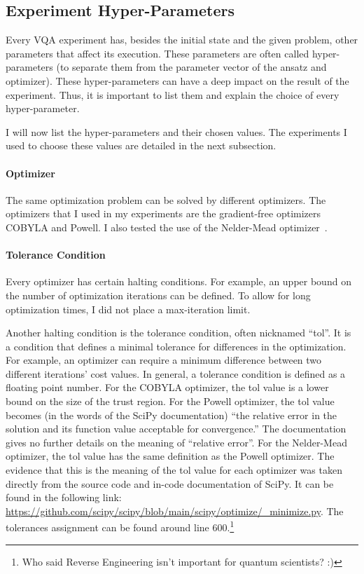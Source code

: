 \documentclass[a4paper,12pt]{article}
\begin{document}
\subsection{Experiment Hyper-Parameters} \label{subsec:hyperparams}
Every VQA experiment has, besides the initial state and the given problem, other parameters that affect its execution.
These parameters are often called hyper-parameters (to separate them from the parameter vector of the ansatz and optimizer).
These hyper-parameters can have a deep impact on the result of the experiment.
Thus, it is important to list them and explain the choice of every hyper-parameter.

I will now list the hyper-parameters and their chosen values.
The experiments I used to choose these values are detailed in the next subsection.

\paragraph*{Optimizer}
The same optimization problem can be solved by different optimizers.
The optimizers that I used in my experiments are the gradient-free optimizers COBYLA and Powell. I also tested the use of the Nelder-Mead optimizer~\cite{Nelder-Mead}.

\paragraph*{Tolerance Condition}
Every optimizer has certain halting conditions.
For example, an upper bound on the number of optimization iterations can be defined.
To allow for long optimization times, I did not place a max-iteration limit.

Another halting condition is the tolerance condition, often nicknamed ``tol''.
It is a condition that defines a minimal tolerance for differences in the optimization.
For example, an optimizer can require a minimum difference between two different iterations' cost values.
In general, a tolerance condition is defined as a floating point number.
For the COBYLA optimizer, the tol value is a lower bound on the size of the trust region.
For the Powell optimizer, the tol value becomes (in the words of the SciPy documentation) ``the relative error in the solution and its function value acceptable for convergence.'' The documentation gives no further details on the meaning of ``relative error''.
For the Nelder-Mead optimizer, the tol value has the same definition as the Powell optimizer.
The evidence that this is the meaning of the tol value for each optimizer was taken directly from the source code and in-code documentation of SciPy.
It can be found in the following link: \url{https://github.com/scipy/scipy/blob/main/scipy/optimize/_minimize.py}. The tolerances assignment can be found around line 600.\footnote{Who said Reverse Engineering isn't important for quantum scientists? :)}
\end{document}
